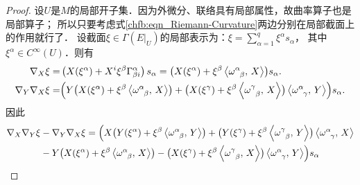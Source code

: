 \begin{proof}
设$U$是$M$的局部开子集．因为外微分、联络具有局部属性，故曲率算子也是局部算子；
所以只要考虑式\eqref{chfb:eqn_Riemann-Curvature}两边分别在局部截面上的作用就行了．
设截面$\xi \in \Gamma(E|_U)$的局部表示为：$\xi =\sum_{\alpha=1}^q \xi^\alpha s_\alpha$，
其中$\xi^\alpha \in C^\infty(U)$．则有
\begin{align*}
    \nabla_X \xi= & \left(X (\xi^\alpha )+ X^i \xi^\beta \Gamma_{\beta i}^\alpha \right) s_\alpha
    = \bigl(X (\xi^\alpha )+ \xi^\beta \left< \omega_{\hphantom{\alpha}\beta}^\alpha,\, X \right> \bigr) s_\alpha . \\
    \nabla_Y \nabla_X \xi= & \Bigl( 
    Y \bigl(X (\xi^\alpha )+ \xi^\beta \left< \omega_{\hphantom{\alpha}\beta}^\alpha,\, X \right> \bigr)+ 
    \bigl(X (\xi^\gamma )+ \xi^\beta \left< \omega_{\hphantom{\alpha}\beta}^\gamma,\, X \right> \bigr)
    \left< \omega_{\hphantom{\alpha}\gamma}^\alpha,\, Y \right> 
    \Bigr) s_\alpha .
\end{align*}
因此
\setlength{\mathindent}{0em}
\begin{align*}
    \nabla_X \nabla_Y \xi & -\nabla_Y \nabla_X \xi =
    \Bigl(      
     X \bigl(Y (\xi^\alpha )+ \xi^\beta \left< \omega_{\hphantom{\alpha}\beta}^\alpha,\, Y \right> \bigr)+ 
     \bigl(Y (\xi^\gamma )+ \xi^\beta \left< \omega_{\hphantom{\alpha}\beta}^\gamma,\, Y \right> \bigr)
     \left< \omega_{\hphantom{\alpha}\gamma}^\alpha,\, X \right> \\
    &-Y \bigl(X (\xi^\alpha )+ \xi^\beta \left< \omega_{\hphantom{\alpha}\beta}^\alpha,\, X \right> \bigr)-
    \bigl(X (\xi^\gamma )+ \xi^\beta \left< \omega_{\hphantom{\alpha}\beta}^\gamma,\, X \right> \bigr)
    \left< \omega_{\hphantom{\alpha}\gamma}^\alpha,\, Y \right>     \Bigr)s_\alpha \\

\end{align*}
\end{proof}
